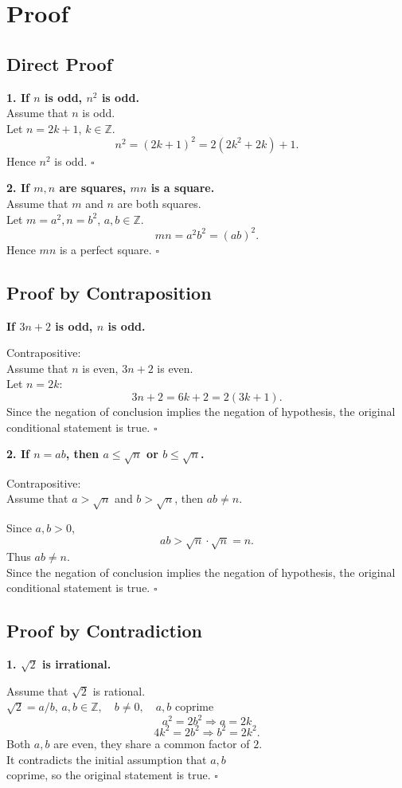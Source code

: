 \section{Proof}
\begingroup
\footnotesize
\subsection{Direct Proof}

\textbf{1. If $n$ is odd, $n^2$ is odd.} \\
Assume that $n$ is odd. \\
Let $n=2k+1$, $k\in\mathbb Z$.
\[
n^2=(2k+1)^2=2(2k^2+2k)+1.
\]
Hence $n^2$ is odd. $\square$

\textbf{2. If $m,n$ are squares, $mn$ is a square.} \\
Assume that $m$ and $n$ are both squares. \\
Let $m=a^2,n=b^2$, $a,b\in\mathbb Z$.
\[
mn=a^2b^2=(ab)^2.
\]
Hence $mn$ is a perfect square. $\square$

\subsection{Proof by Contraposition}

\textbf{If $3n+2$ is odd, $n$ is odd.}

Contrapositive: \\ 
Assume that $n$ is even, $3n+2$ is even. \\
Let $n=2k$:
\[
3n+2=6k+2=2(3k+1).
\]
Since the negation of conclusion implies the negation of hypothesis, the original conditional statement is true. $\square$

\textbf{2. If $n=ab$, then $a\leq\sqrt n$
or $b\leq\sqrt n$.}

Contrapositive: \\ 
Assume that $a>\sqrt n$ and
$b>\sqrt n$, then $ab\neq n$.

Since $a,b>0$,
\[
ab>\sqrt n\cdot\sqrt n=n.
\]
Thus $ab\neq n$. \\
Since the negation of conclusion implies the negation of hypothesis, the original conditional statement is true. $\square$
\subsection{Proof by Contradiction}

\textbf{1. $\sqrt{2}$ is irrational.}

Assume that $\sqrt{2}$ is rational. \\
$\sqrt2=a/b$, 
$a,b\in\mathbb{Z},\quad b\neq 0,\quad a, b \text{ coprime }$
\[
a^2=2b^2\Rightarrow a=2k
\]
\[
4k^2=2b^2\Rightarrow b^2=2k^2.
\]
Both $a,b$ are even, they share a common factor of $2$. \\
It contradicts the initial assumption that $a, b$ \\ coprime, so the original statement is true.
$\square$

